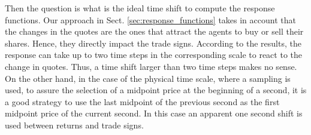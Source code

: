 Then the question is what is the ideal time shift to compute the response
functions. Our approach in Sect. \ref{sec:response_functions} takes in account
that the changes in the quotes are the ones that attract the agents to buy or
sell their shares. Hence, they directly impact the trade signs. According to
the results, the response can take up to two time steps in the corresponding
scale to react to the change in quotes. Thus, a time shift larger than two time
steps makes no sense.
On the other hand, in the case of the physical time scale, where a sampling is
used, to assure the selection of a midpoint price at the beginning of a second,
it is a good strategy to use the last midpoint of the previous second as the
first midpoint price of the current second. In this case an apparent one second
shift is used between returns and trade signs.